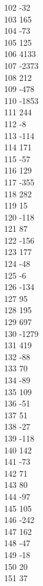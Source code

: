 { 102	-32 \\
 103	165 \\
 104	-73 \\
 105	125 \\
 106	4133 \\
 107	-2373 \\
 108	212 \\
 109	-478 \\
 110	-1853 \\
 111	244 \\
 112	-8 \\
 113	-114 \\
 114	171 \\
 115	-57 \\
 116	129 \\
 117	-355 \\
 118	282 \\
 119	15 \\
 120	-118 \\
 121	87 \\
 122	-156 \\
 123	177 \\
 124	-48 \\
 125	-6 \\
 126	-134 \\
 127	95 \\
 128	195 \\
 129	697 \\
 130	-1279 \\
 131	419 \\
 132	-88 \\
 133	70 \\
 134	-89 \\
 135	109 \\
 136	-51 \\
 137	51 \\
 138	-27 \\
 139	-118 \\
 140	142 \\
 141	-73 \\
 142	71 \\
 143	80 \\
 144	-97 \\
 145	105 \\
 146	-242 \\
 147	162 \\
 148	-47 \\
 149	-18 \\
 150	20 \\
 151	37 \\
}
